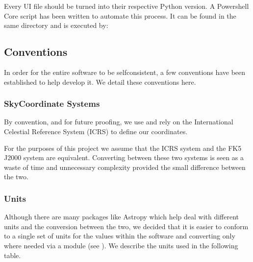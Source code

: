 \documentclass[letterpaper,11pt,english]{sphinxmanual}
\begin{document}
\sphinxAtStartPar
Every UI file should be turned into their respective Python version. A
Powershell Core script has been written to automate this process. It can be
found in the same directory and is executed by:

\begin{sphinxVerbatim}[commandchars=\\\{\}]
 
\end{sphinxVerbatim}

\sphinxstepscope


\subsection{Conventions}
\label{\detokenize{technical/conventions:conventions}}\label{\detokenize{technical/conventions:technical-conventions}}\label{\detokenize{technical/conventions::doc}}
\sphinxAtStartPar
In order for the entire software to be self\sphinxhyphen{}consistent, a few conventions
have been established to help develop it. We detail these conventions here.


\subsubsection{Sky\sphinxhyphen{}Coordinate Systems}
\label{\detokenize{technical/conventions:sky-coordinate-systems}}
\sphinxAtStartPar
By convention, and for future proofing, we use and rely on the International
Celestial Reference System (ICRS) to define our coordinates.

\sphinxAtStartPar
For the purposes of this project we assume that the ICRS system and the
FK5 J2000 system are equivalent. Converting between these two systems is
seen as a waste of time and unnecessary complexity provided the small
difference between the two.


\subsubsection{Units}
\label{\detokenize{technical/conventions:units}}
\sphinxAtStartPar
Although there are many packages like Astropy which help deal with different
units and the conversion between the two, we decided that it is easier to
conform to a single set of units for the values within the software and
converting only where needed via a module (see
{\hyperref[\detokenize{technical/architecture/library:technical-architecture-library-conversion}]{}}). We describe the units used
in the following table.
\end{document}
